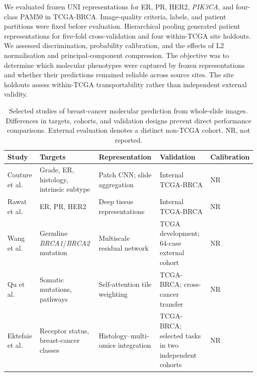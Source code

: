 \documentclass[pdflatex]{cas-dc}
\theoremstyle{remark}
\theoremstyle{plain}
\begin{document}
We evaluated frozen UNI representations for ER, PR, HER2, \textit{PIK3CA}, and four-class PAM50 in TCGA-BRCA. Image-quality criteria, labels, and patient partitions were fixed before evaluation. Hierarchical pooling generated patient representations for five-fold cross-validation and four within-TCGA site holdouts. We assessed discrimination, probability calibration, and the effects of L2 normalisation and principal-component compression. The objective was to determine which molecular phenotypes were captured by frozen representations and whether their predictions remained reliable across source sites. The site holdouts assess within-TCGA transportability rather than independent external validity.

\begin{table}[htbp]
\centering
\caption{Selected studies of breast-cancer molecular prediction from whole-slide images. Differences in targets, cohorts, and validation designs prevent direct performance comparisons. External evaluation denotes a distinct non-TCGA cohort. NR, not reported.}
\label{tab:sota}
\footnotesize
\renewcommand{\arraystretch}{1.10}
\setlength{\tabcolsep}{3pt}

\begin{tabularx}{\textwidth}{
@{}
>{\raggedright\arraybackslash}p{1.55cm}
>{\raggedright\arraybackslash}p{2.05cm}
>{\raggedright\arraybackslash}p{2.35cm}
>{\raggedright\arraybackslash}X
>{\raggedright\arraybackslash}p{2.30cm}
@{}}
\toprule
\textbf{Study} &
\textbf{Targets} &
\textbf{Representation} &
\textbf{Validation} &
\textbf{Calibration} \\
\midrule

Couture et al.~\citep{Couture2018}
& Grade, ER, histology, intrinsic subtype
& Patch CNN; slide aggregation
& Internal TCGA-BRCA
& NR \\

Rawat et al.~\citep{Rawat2020}
& ER, PR, HER2
& Deep tissue representations
& Internal TCGA-BRCA
& NR \\

Wang et al.~\citep{Wang2021BRCA}
& Germline \textit{BRCA1}/\textit{BRCA2} mutation
& Multiscale residual network
& TCGA development; 64-case external cohort
& NR \\

Qu et al.~\citep{Qu2021}
& Somatic mutations, pathways
& Self-attention tile weighting
& TCGA-BRCA; cross-cancer transfer
& NR \\

Ektefaie et al.~\citep{Ektefaie2021}
& Receptor status, breast-cancer classes
& Histology--multi-omics integration
& TCGA-BRCA; selected tasks in two independent cohorts
& NR \\


\end{tabularx}
\end{table}
\end{document}
